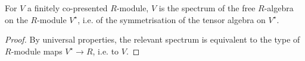 \begin{lemma}\label{functions-on-module}
For $V$ a finitely co-presented $R$-module, $V$ is the spectrum of
the free $R$-algebra on the $R$-module $V^\star$, i.e. of the symmetrisation of
the tensor algebra on $V^\star$.
\end{lemma}
\begin{proof}
By universal properties, the relevant spectrum is equivalent to the type
of $R$-module maps $V^\star \to R$, i.e. to $V$.
\end{proof}
